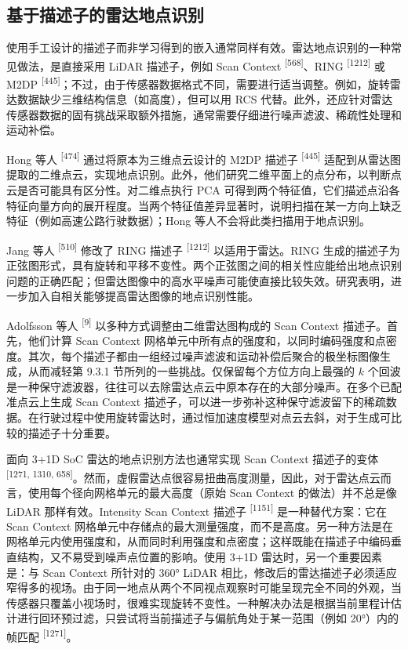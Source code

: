 \subsection{基于描述子的雷达地点识别}

使用手工设计的描述子而非学习得到的嵌入通常同样有效。雷达地点识别的一种常见做法，是直接采用 LiDAR 描述子，例如 Scan Context \textsuperscript{[568]}、RING \textsuperscript{[1212]} 或 M2DP \textsuperscript{[445]}；不过，由于传感器数据格式不同，需要进行适当调整。例如，旋转雷达数据缺少三维结构信息（如高度），但可以用 RCS 代替。此外，还应针对雷达传感器数据的固有挑战采取额外措施，通常需要仔细进行噪声滤波、稀疏性处理和运动补偿。

Hong 等人 \textsuperscript{[474]} 通过将原本为三维点云设计的 M2DP 描述子 \textsuperscript{[445]} 适配到从雷达图提取的二维点云，实现地点识别。此外，他们研究二维平面上的点分布，以判断点云是否可能具有区分性。对二维点执行 PCA 可得到两个特征值，它们描述点沿各特征向量方向的展开程度。当两个特征值差异显著时，说明扫描在某一方向上缺乏特征（例如高速公路行驶数据）；Hong 等人不会将此类扫描用于地点识别。

Jang 等人 \textsuperscript{[510]} 修改了 RING 描述子 \textsuperscript{[1212]} 以适用于雷达。RING 生成的描述子为正弦图形式，具有旋转和平移不变性。两个正弦图之间的相关性应能给出地点识别问题的正确匹配；但雷达图像中的高水平噪声可能使直接比较失效。研究表明，进一步加入自相关能够提高雷达图像的地点识别性能。

Adolfsson 等人 \textsuperscript{[9]} 以多种方式调整由二维雷达图构成的 Scan Context 描述子。首先，他们计算 Scan Context 网格单元中所有点的强度和，以同时编码强度和点密度。其次，每个描述子都由一组经过噪声滤波和运动补偿后聚合的极坐标图像生成，从而减轻第 9.3.1 节所列的一些挑战。仅保留每个方位方向上最强的 $k$ 个回波是一种保守滤波器，往往可以去除雷达点云中原本存在的大部分噪声。在多个已配准点云上生成 Scan Context 描述子，可以进一步弥补这种保守滤波留下的稀疏数据。在行驶过程中使用旋转雷达时，通过恒加速度模型对点云去斜，对于生成可比较的描述子十分重要。

面向 3+1D SoC 雷达的地点识别方法也通常实现 Scan Context 描述子的变体 \textsuperscript{[1271, 1310, 658]}。然而，虚假雷达点很容易扭曲高度测量，因此，对于雷达点云而言，使用每个径向网格单元的最大高度（原始 Scan Context 的做法）并不总是像 LiDAR 那样有效。Intensity Scan Context 描述子 \textsuperscript{[1151]} 是一种替代方案：它在 Scan Context 网格单元中存储点的最大测量强度，而不是高度。另一种方法是在网格单元内使用强度和，从而同时利用强度和点密度；这样既能在描述子中编码垂直结构，又不易受到噪声点位置的影响。使用 3+1D 雷达时，另一个重要因素是：与 Scan Context 所针对的 360° LiDAR 相比，修改后的雷达描述子必须适应窄得多的视场。由于同一地点从两个不同视点观察时可能呈现完全不同的外观，当传感器只覆盖小视场时，很难实现旋转不变性。一种解决办法是根据当前里程计估计进行回环预过滤，只尝试将当前描述子与偏航角处于某一范围（例如 20°）内的帧匹配 \textsuperscript{[1271]}。

